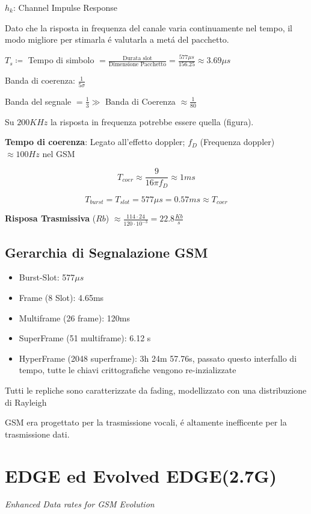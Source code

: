 \documentclass{article}
\begin{document}
$h_k$: Channel Impulse Response

Dato che la risposta in frequenza del canale varia continuamente nel tempo, il modo migliore per stimarla \'e valutarla a met\'a del pacchetto.

$T_s \coloneqq$ Tempo di simbolo $ = \frac{\text{Durata slot}}{\text{Dimensione Pacchetto}} = \frac{577 \mu s}{156.25} \approx 3.69\mu s$

Banda di coerenza: $\frac{1}{5\sigma}$

Banda del segnale $=\frac{1}{3} \gg$ Banda di Coerenza $\approx \frac{1}{80}$

Su $200KHz$ la risposta in frequenza potrebbe essere quella (figura).

\textbf{Tempo di coerenza}: Legato all'effetto doppler; $f_D$ (Frequenza doppler) $\approx 100Hz$ nel GSM

\[ T_{coer} \approx \frac{9}{16\pi f_D} \approx 1ms \]

\[T_{burst} = T_{slot} = 577 \mu s = 0.57 ms \approx T_{coer}\]

\textbf{Risposa Trasmissiva} ($Rb$) $\approx \frac{114\cdot24}{120\cdot10^{-3}} = 22.8\frac{Kb}{s}$

\subsection{Gerarchia di Segnalazione GSM}
\begin{itemize}
    \item Burst-Slot: 577$\mu s$
    \item Frame (8 Slot): 4.65ms
    \item Multiframe (26 frame): 120ms
    \item SuperFrame (51 multiframe): 6.12 s
    \item HyperFrame (2048 superframe): 3h 24m 57.76s, passato questo interfallo di tempo, tutte le chiavi crittografiche vengono re-inzializzate
\end{itemize}


Tutti le repliche sono caratterizzate da fading, modellizzato con una distribuzione di Rayleigh


GSM era progettato per la trasmissione vocali, \'e altamente inefficente per la trasmissione dati.



\section{EDGE ed Evolved EDGE(2.7G)}
\textit{Enhanced Data rates for GSM Evolution}
\end{document}
